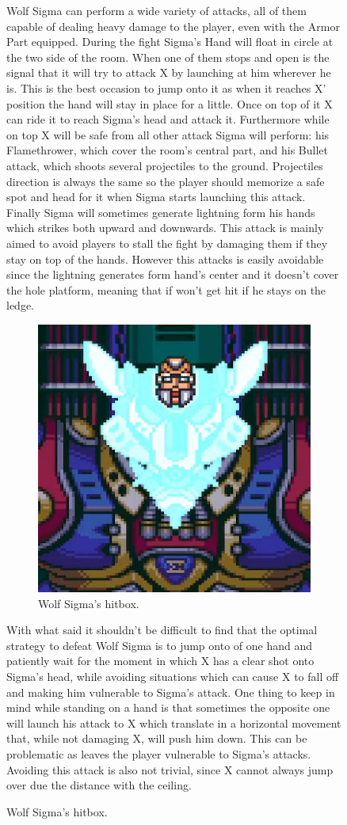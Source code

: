 \begin{figure}[htp]
Wolf Sigma can perform a wide variety of attacks, all of them capable of dealing heavy damage to the player, even with the Armor Part equipped. During the fight Sigma's Hand will float in circle at the two side of the room. When one of them stops and open is the signal that it will try to attack X by launching at him wherever he is. This is the best occasion to jump onto it as when it reaches X' position the hand will stay in place for a little. Once on top of it X can ride it to reach Sigma's head and attack it. Furthermore while on top X will be safe from all other attack Sigma will perform: his Flamethrower, which cover the room's central part, and his Bullet attack, which shoots several projectiles to the ground. Projectiles direction is always the same so the player should memorize a safe spot and head for it when Sigma starts launching this attack. Finally Sigma will sometimes generate lightning form his hands which strikes both upward and downwards. This attack is mainly aimed to avoid players to stall the fight by damaging them if they stay on top of the hands. However this attacks is easily avoidable since the lightning generates form hand's center and it doesn't cover the hole platform, meaning that if won't get hit if he stays on the ledge. 
\begin{figure}[htp]
	\centering		
	\includegraphics[width=0.4\linewidth]{figures/X1/Sigma_stages/WolfSigma_hitbox.jpg}
	\caption{Wolf Sigma's hitbox.}
\end{figure}
With what said it shouldn't be difficult to find that the optimal strategy to defeat Wolf Sigma is to jump onto of one hand and patiently wait for the moment in which X has a clear shot onto Sigma's head, while avoiding situations which can cause X to fall off and making him vulnerable to Sigma's attack. One thing to keep in mind while standing on a hand is that sometimes the opposite one will launch his attack to X which translate in a horizontal movement that, while not damaging X, will push him down. This can be problematic as leaves the player vulnerable to Sigma's attacks. Avoiding this attack is also not trivial, since X cannot always jump over due the distance with the ceiling.

\end{figure}
